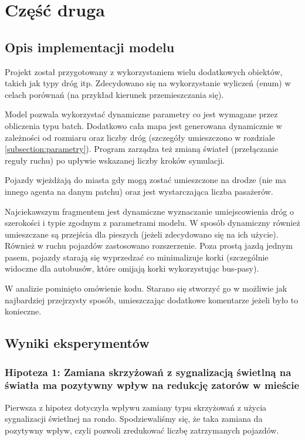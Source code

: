 \documentclass{article}
\begin{document}
\section{Część druga}
\subsection{Opis implementacji modelu}
Projekt został przygotowany z wykorzystaniem wielu dodatkowych obiektów, takich jak typy dróg itp. Zdecydowano się na wykorzystanie wyliczeń (enum) w celach porównań (na przykład kierunek przemieszczania się).

Model pozwala wykorzystać dynamiczne parametry co jest wymagane przez obliczenia typu batch. Dodatkowo cała mapa jest generowana dynamicznie w zależności od rozmiaru oraz liczby dróg (szczegóły umieszczono w rozdziale \ref{subsection:parametry}). Program zarządza też zmianą świateł (przełączanie reguły ruchu) po upływie wskazanej liczby kroków symulacji.

Pojazdy wjeżdżają do miasta gdy mogą zostać umieszczone na drodze (nie ma innego agenta na danym patchu) oraz jest wystarczająca liczba pasażerów.

Najciekawszym fragmentem jest dynamiczne wyznaczanie umiejscowienia dróg o szerokości i typie zgodnym z parametrami modelu. W sposób dynamiczny również umieszczane są przejścia dla pieszych (jeżeli zdecydowano się na ich użycie). Również w ruchu pojazdów zastosowano rozszerzenie. Poza prostą jazdą jednym pasem, pojazdy starają się wyprzedzać co minimalizuje korki (szczególnie widoczne dla autobusów, które omijają korki wykorzystując bus-pasy).

W analizie pominięto omówienie kodu. Starano się stworzyć go w możliwie jak najbardziej przejrzysty sposób, umieszczając dodatkowe komentarze jeżeli było to konieczne.

\subsection{Wyniki eksperymentów}
\label{subsection:wyniki-eksperymentow}

\subsubsection{Hipoteza 1: Zamiana skrzyżowań z sygnalizacją świetlną na światła ma pozytywny wpływ na redukcję zatorów w mieście}
Pierwsza z hipotez dotyczyła wpływu zamiany typu skrzyżowań z użycia sygnalizacji świetlnej na rondo. Spodziewaliśmy się, że taka zamiana da pozytywny wpływ, czyli pozwoli zredukować liczbę zatrzymanych pojazdów.
\end{document}
